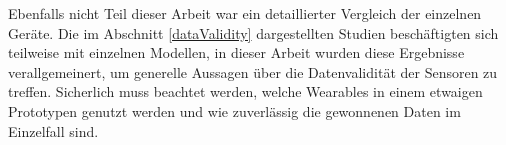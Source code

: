 Ebenfalls nicht Teil dieser Arbeit war ein detaillierter Vergleich der einzelnen Geräte. Die im Abschnitt \ref{dataValidity} dargestellten Studien beschäftigten sich teilweise mit einzelnen Modellen, in dieser Arbeit wurden diese Ergebnisse verallgemeinert, um generelle Aussagen über die Datenvalidität der Sensoren zu treffen. Sicherlich muss beachtet werden, welche Wearables in einem etwaigen Prototypen genutzt werden und wie zuverlässig die gewonnenen Daten im Einzelfall sind.
